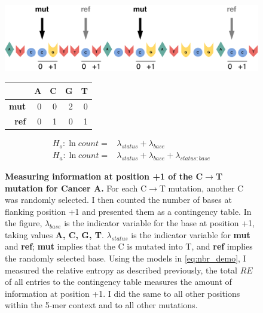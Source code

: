 \begin{figure}[ht!]
  \begin{minipage}[c]{\textwidth}
    \includegraphics[width=\textwidth]{graphics/flank_demo.pdf}
  \end{minipage}\hfill
  \vspace{1cm}
  
  \begin{minipage}[c]{0.48\textwidth}
  \centering
    \begin{tabulary}{\columnwidth}{rRRRR}
    \toprule
        & \textbf{A} & \textbf{C} & \textbf{G} & \textbf{T}  \\
    \hline
        \textbf{mut} & 0 & 0 & 2 & 0  \\
        \textbf{ref} & 0 & 1 & 0 & 1  \\
    \bottomrule
    \end{tabulary}
  \end{minipage}\hfill
  \begin{minipage}[c]{0.48\textwidth}
    \begin{equation}
        \begin{aligned}
            H_o: \ln{count} =& \lambda_{status} + \lambda_{base} \\
            H_a: \ln{count} =& \lambda_{status} + \lambda_{base} + \lambda_{status:base}
        \end{aligned}
        \label{eq:nbr_demo}
    \end{equation}
  \end{minipage}
  \vspace{0.5cm}
  
  \begin{minipage}[c]{\textwidth}
    \caption{
      \textbf{Measuring information at position +1 of the C$\rightarrow$T mutation for Cancer A.} For each C$\rightarrow$T mutation, another C was randomly selected. I then counted the number of bases at flanking position +1 and presented them as a contingency table. In the figure, $\lambda_{base}$ is the indicator variable for the base at position +1, taking values \textbf{A, C, G, T}. $\lambda_{status}$ is the indicator variable for \textbf{mut} and \textbf{ref}; \textbf{mut} implies that the C is mutated into T, and \textbf{ref} implies the randomly selected base. Using the models in \ref{eq:nbr_demo}, I measured the relative entropy as described previously, the total $RE$ of all entries to the contingency table measures the amount of information at position +1. I did the same to all other positions within the 5-mer context and to all other mutations.
    } \label{fig:nbr_demo}
  \end{minipage}
\end{figure}
